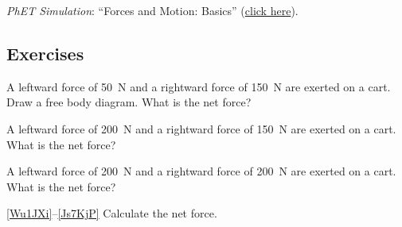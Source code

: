 \documentclass[main.tex]{subfiles}
\begin{document}
\textit{PhET Simulation}: ``Forces and Motion: Basics'' (\href{https://phet.colorado.edu/en/simulations/forces-and-motion-basics}{click here}).



\subsection{Exercises}




\begin{exercise} \label{RApeJt}
A leftward force of \SI{50}{N} and a rightward force of \SI{150}{N} are exerted on a cart. Draw a free body diagram. What is the net force?
\end{exercise}

\begin{exercise} \label{MUJe54}
A leftward force of \SI{200}{N} and a rightward force of \SI{150}{N} are exerted on a cart. What is the net force? 
\end{exercise}

\begin{exercise} \label{Uhrg0I}
A leftward force of \SI{200}{N} and a rightward force of \SI{200}{N} are exerted on a cart. What is the net force? 
\end{exercise}

\cyanhrule
\vspace{2ex}


\ref{Wu1JXi}--\ref{Js7KjP} Calculate the net force.

\begin{exercise} \label{Wu1JXi}
\phantom{.}
\vspace{-2em}
\end{exercise}

\begin{center}
\end{center}
\end{document}
